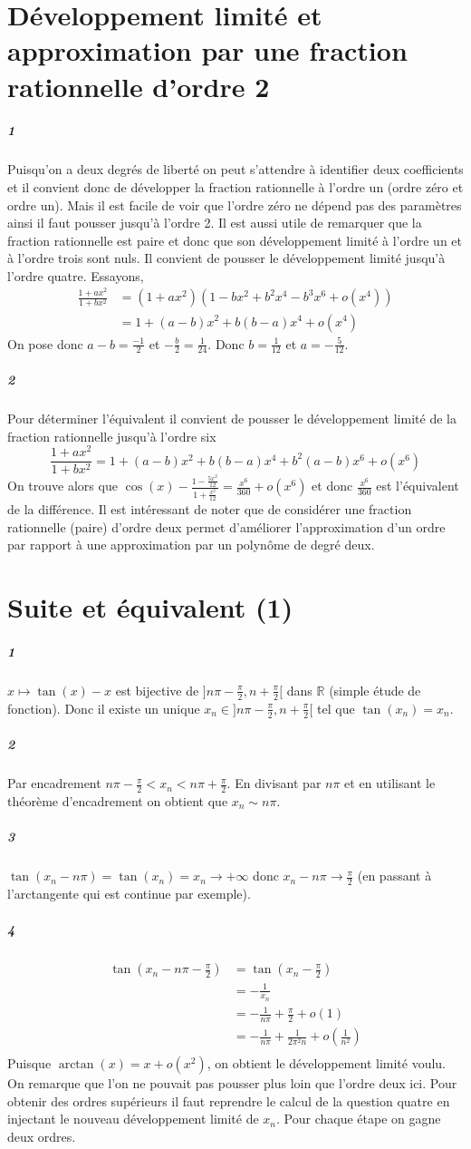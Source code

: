 \documentclass[10pt,a4paper]{article}
\newcommand{\al}[1]{\begin{aligned} #1 \end{aligned}}
\begin{document}
\section{Développement limité et approximation par une fraction rationnelle d'ordre 2}

\subparagraph{1} Puisqu'on a deux degrés de liberté on peut s'attendre à identifier deux coefficients et il convient donc de développer la fraction rationnelle à l'ordre un (ordre zéro et ordre un). Mais il est facile de voir que l'ordre zéro ne dépend pas des paramètres ainsi il faut pousser jusqu'à l'ordre 2. Il est aussi utile de remarquer que la fraction rationnelle est paire et donc que son développement limité à l'ordre un et à l'ordre trois sont nuls. Il convient de pousser le développement limité jusqu'à l'ordre quatre. Essayons,
\[
\al{
\frac{1+ax^2}{1+bx^2} &= (1+ax^2)(1-bx^2 + b^2x^4 -b^3x^6 + o(x^4)) \\
&=1+(a-b)x^2 +b(b-a)x^4 +o(x^4)
}
\]
On pose donc $a-b = \frac{-1}{2}$ et $-\frac{b}{2}=\frac{1}{24}$. Donc $b = \frac{1}{12}$ et $a = -\frac{5}{12}$. 
\subparagraph{2}Pour déterminer l'équivalent il convient de pousser le développement limité de la fraction rationnelle jusqu'à l'ordre six
\[
\frac{1+ax^2}{1+bx^2} = 1+(a-b)x^2 +b(b-a)x^4 + b^2(a-b)x^6 + o(x^6)
\]
On trouve alors que $\cos(x) - \frac{1 -\frac{5x^2}{12}}{1 + \frac{x^2}{12}} = \frac{x^6}{360} + o(x^6)$ et donc $\frac{x^6}{360}$ est l'équivalent de la différence. Il est intéressant de noter que de considérer une fraction rationnelle (paire) d'ordre deux permet d'améliorer l'approximation d'un ordre par rapport à une approximation par un polynôme de degré deux.

\section{Suite et équivalent (1)}
\subparagraph{1}$x \mapsto \tan(x) -x $ est bijective de $]n\pi-\frac{\pi}{2}, n+\frac{\pi}{2}[$ dans $\mathbb{R}$ (simple étude de fonction). Donc il existe un unique $x_n \in ]n\pi-\frac{\pi}{2}, n+\frac{\pi}{2}[$ tel que $\tan(x_n) = x_n$.
\subparagraph{2}Par encadrement $n\pi - \frac{\pi}{2} < x_n < n\pi + \frac{\pi}{2}$. En divisant par $n\pi$ et en utilisant le théorème d'encadrement on obtient que $x_n \sim n\pi$. 
\subparagraph{3}$\tan(x_n - n\pi) = \tan(x_n) = x_n \rightarrow +\infty$ donc $x_n -n\pi \rightarrow \frac{\pi}{2}$ (en passant à l'arctangente qui est continue par exemple). 
\subparagraph{4}
\[
\al{
\tan(x_n - n\pi - \frac{\pi}{2}) &= \tan(x_n -\frac{\pi}{2}) \\
&= -\frac{1}{x_n} \\
&= -\frac{1}{n\pi} + \frac{\pi}{2} + o(1) \\
&=-\frac{1}{n\pi} + \frac{1}{2\pi^2n} + o(\frac{1}{n^2}) \\
}
\]
Puisque $\arctan(x) = x + o(x^2)$, on obtient le développement limité voulu. On remarque que l'on ne pouvait pas pousser plus loin que l'ordre deux ici. Pour obtenir des ordres supérieurs il faut reprendre le calcul de la question quatre en injectant le nouveau développement limité de $x_n$. Pour chaque étape on gagne deux ordres.
\end{document}
